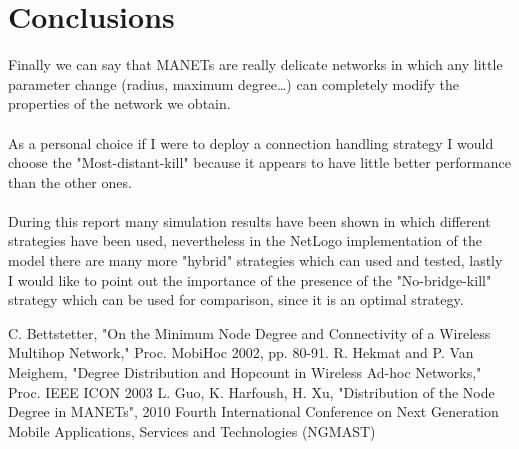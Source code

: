 \documentclass{llncs}
\begin{document}
\section{Conclusions} 
Finally we can say that MANETs are really delicate networks in which any little parameter change (radius, maximum degree\dots) can completely modify the properties of the network we obtain.
\\\\
As a personal choice if I were to deploy a connection handling strategy I would choose the "Most-distant-kill" because it appears to have little better performance than the other ones.
\\\\
During this report many simulation results have been shown in which different strategies have been used, nevertheless in the NetLogo implementation of the model there are many more "hybrid" strategies which can used and tested, lastly I would like to point out the importance of the presence of the "No-bridge-kill" strategy which can be used for comparison, since it is an optimal strategy.
%
\begin{thebibliography}{}
	 C. Bettstetter, "On the Minimum Node Degree and Connectivity of a Wireless Multihop Network," Proc. MobiHoc 2002, pp. 80-91.
	 R. Hekmat and P. Van Meighem, "Degree Distribution and Hopcount in Wireless Ad-hoc Networks," Proc. IEEE ICON 2003
	 L. Guo, K. Harfoush, H. Xu, "Distribution of the Node Degree in MANETs", 2010 Fourth International Conference on Next Generation Mobile Applications, Services and Technologies (NGMAST)
\end{thebibliography}
\end{document}
